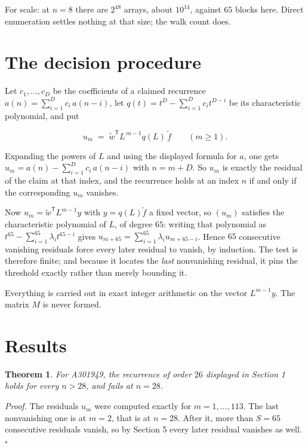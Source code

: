 \documentclass[11pt]{article}
\newtheorem{theorem}{Theorem}
\theoremstyle{definition}
\begin{document}
For scale: at $n = 8$ there are $2^{48}$ arrays, about $10^{14}$, against $65$ blocks here. Direct enumeration settles nothing at that size; the walk count does.

\section{The decision procedure}

Let $c_1,\dots,c_D$ be the coefficients of a claimed recurrence $a(n) = \sum_{i=1}^{D} c_i\,a(n-i)$, let $q(t) = t^{D} - \sum_{i=1}^{D} c_i t^{D-i}$ be its characteristic polynomial, and put

\[u_m \;=\; \tilde w^{\mathsf T} L^{\,m-1} q(L)\,\tilde f \qquad (m \ge 1).\]

Expanding the powers of $L$ and using the displayed formula for $a$, one gets $u_m = a(n) - \sum_{i=1}^{D} c_i\,a(n-i)$ with $n = m + D$. So $u_m$ is exactly the residual of the claim at that index, and the recurrence holds at an index $n$ if and only if the corresponding $u_m$ vanishes.

Now $u_m = \tilde w^{\mathsf T} L^{m-1} y$ with $y = q(L)\tilde f$ a fixed vector, so $(u_m)$ satisfies the characteristic polynomial of $L$, of degree $65$: writing that polynomial as $t^{65} - \sum_{i=1}^{65} \lambda_i t^{65-i}$ gives $u_{m+65} = \sum_{i=1}^{65} \lambda_i u_{m+65-i}$. Hence $65$ consecutive vanishing residuals force every later residual to vanish, by induction. The test is therefore finite; and because it locates the {\itshape last} nonvanishing residual, it pins the threshold exactly rather than merely bounding it.

Everything is carried out in exact integer arithmetic on the vector $L^{m-1}y$. The matrix $M$ is never formed.

\section{Results}

\begin{theorem} For A301949, the recurrence of order $26$ displayed in Section 1 holds for every $n > 28$, and fails at $n = 28$.\end{theorem}

{\itshape Proof.} The residuals $u_m$ were computed exactly for $m = 1,\dots,113$. The last nonvanishing one is at $m = 2$, that is at $n = 28$. After it, more than $S = 65$ consecutive residuals vanish, so by Section 5 every later residual vanishes as well. $\square$
\end{document}
